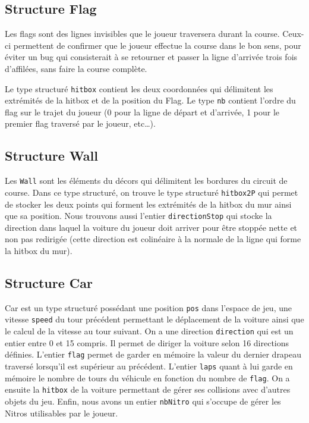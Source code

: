 \documentclass[11pt, final]{report}
\renewcommand{\tt}[1]{\texttt{#1}}
\begin{document}
\subsection{Structure Flag}



Les flags sont des lignes invisibles que le joueur traversera durant la course. Ceux-ci permettent de confirmer que le joueur effectue la course dans le bon sens, pour éviter un bug qui consisterait à se retourner et passer la ligne d'arrivée trois fois d'affilées, sans faire la course complète. 

Le type structuré \tt{hitbox} contient les deux coordonnées qui délimitent les extrémités de la hitbox et de la position du Flag. Le type \tt{nb} contient l'ordre du flag sur le trajet du joueur (0 pour la ligne de départ et d'arrivée, 1 pour le premier flag traversé par le joueur, etc\ldots).
\\
\pagebreak
\subsection{Structure Wall}


Les \tt{Wall} sont les éléments du décors qui délimitent les bordures du circuit de course. Dans ce type structuré, on trouve le type structuré \tt{hitbox2P} qui permet de stocker les deux points qui forment les extrémités de la hitbox du mur ainsi que sa position. Nous trouvons aussi l'entier \tt{directionStop} qui stocke la direction dans laquel la voiture du joueur doit arriver pour être stoppée nette et non pas redirigée (cette direction est colinéaire à la normale de la ligne qui forme la hitbox du mur).
\\

\subsection{Structure Car}



Car est un type structuré possédant une position \tt{pos} dans l'espace de jeu, une vitesse \tt{speed} du tour précédent permettant le déplacement de la voiture ainsi que le calcul de la vitesse au tour suivant. On a une direction \tt{direction} qui est un entier entre 0 et 15 compris. Il permet de diriger la voiture selon 16 directions définies. L'entier \tt{flag} permet de garder en mémoire la valeur du dernier drapeau traversé lorsqu'il est supérieur au précédent. L'entier \tt{laps} quant à lui garde en mémoire le nombre de tours du véhicule en fonction du nombre de \tt{flag}. On a ensuite la \tt{hitbox} de la voiture permettant de gérer ses collisions avec d'autres objets du jeu. Enfin, nous avons un entier \tt{nbNitro} qui s'occupe de gérer les Nitros utilisables par le joueur.
\\
\end{document}
